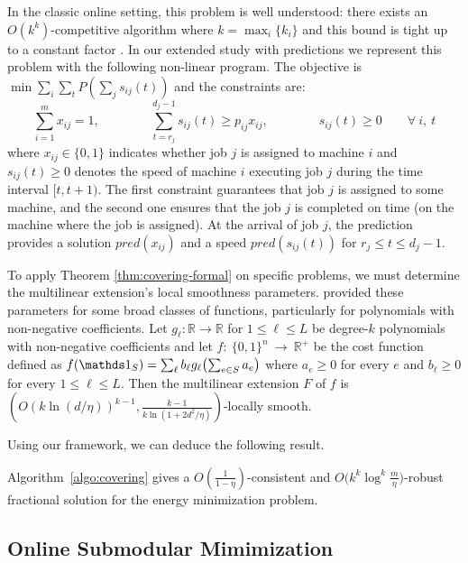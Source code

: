In the classic online setting, this problem is well understood: there exists an $O(k^{k})$-competitive algorithm \cite{Thang20:Online-Primal-Dual} where $k = \max_{i} \{k_{i}\}$
and this bound is tight up to a constant factor \cite{Caragiannis08:Better-bounds}. In our extended study with predictions we represent this problem with the following non-linear program. The objective is $\min \sum_{i} \sum_{t} P(\sum_{j} s_{ij}(t))$ and the constraints are:
$$
\sum_{i=1}^{m} x_{ij} = 1,  \qquad \qquad \sum_{t = r_{j}}^{d_{j}-1} s_{ij}(t) \geq p_{ij} x_{ij}, \qquad  \qquad s_{ij}(t) \geq 0  \qquad \forall\ i,\ t
$$
where $x_{ij} \in \{0,1\}$ indicates whether job $j$ is assigned to machine $i$
and $s_{ij}(t) \geq 0$ denotes the speed of machine $i$ executing job $j$ during the time interval $[t, t+1)$.
The first constraint guarantees that job $j$ is assigned to some machine, and the second one ensures
that the job $j$ is completed on time (on the machine where the job is assigned). At the arrival of
job $j$, the prediction provides a solution $pred(x_{ij})$ and a speed $pred(s_{ij}(t))$ for $r_{j} \leq t \leq d_{j} - 1$.


To apply Theorem \ref{thm:covering-formal} on specific problems, we must determine the multilinear extension's local smoothness parameters.
\cite{Thang20:Online-Primal-Dual} provided these parameters for some broad classes of functions, particularly for polynomials with non-negative coefficients. Let $g_{\ell}: \mathbb{R} \rightarrow \mathbb{R}$ for $1 \leq \ell \leq L$
be degree-$k$ polynomials with non-negative coefficients and let $f:~\{0,1\}^{n}~\rightarrow~\mathbb{R}^{+}$ be the cost function
defined as $f(\one_{S}) = \sum_{\ell} b_{\ell} g_{\ell}\bigl( \sum_{e \in S} a_{e} \bigr)$ where $a_{e} \geq 0$ for every
$e$ and $b_{\ell} \geq 0$ for every $1 \leq \ell \leq L$.
Then the multilinear extension $F$ of $f$ is $(O(k \ln(d/\eta))^{k-1}, \frac{k-1}{k \ln(1 + 2d^{2}/\eta)})$-locally smooth.



Using our framework, we can deduce the following result.

\begin{proposition}
Algorithm~\ref{algo:covering} gives a
$O(\frac{1}{1 - \eta})$-consistent and $O\bigl(k^{k} \log^{k} \frac{m}{\eta}\bigr)$-robust fractional solution
for the energy minimization problem.
\end{proposition}


\subsection{Online Submodular Mimimization}	\label{sec:sub-min}

